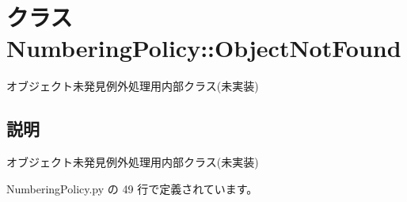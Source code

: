 \section{クラス NumberingPolicy::ObjectNotFound}
\label{classsource__py_1_1_numbering_policy_1_1_numbering_policy_1_1_object_not_found}
オブジェクト未発見例外処理用内部クラス(未実装)  




\subsection{説明}
オブジェクト未発見例外処理用内部クラス(未実装) 

 NumberingPolicy.py の 49 行で定義されています。